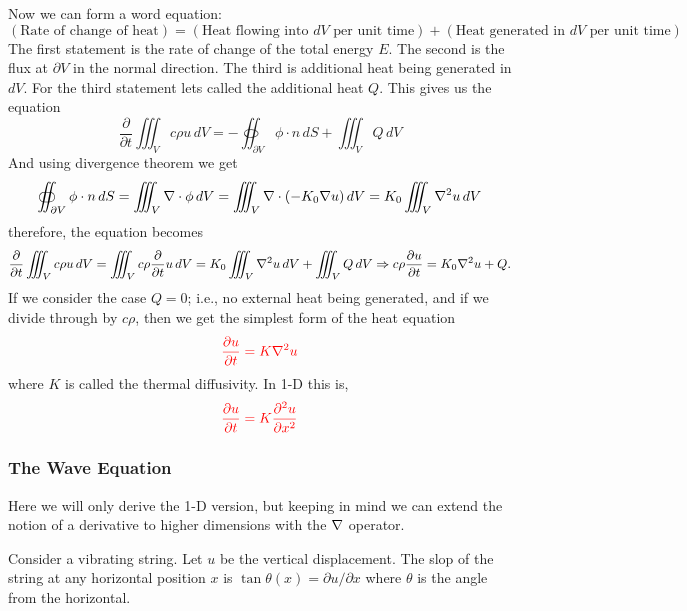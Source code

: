 \documentclass[reqno]{amsart}
\theoremstyle{definition}
\begin{document}
Now we can form a word equation:
%
\begin{equation}
\left(\text{Rate of change of heat}\right)
= \left(\text{Heat flowing into $dV$ per unit time}\right) +
\left(\text{Heat generated in $dV$ per unit time}\right)
\end{equation}
%
The first statement is the rate of change of the total energy $E$.
The second is the flux at $\partial V$ in the normal direction.  
The third is additional heat being generated in $dV$.  For the third
statement lets called the additional heat $Q$.
This gives us the equation
%
\begin{equation}
\frac{\partial}{\partial t} \iiint_V c\rho u\, dV
= - \oiint_{\partial V} \phi\cdot n\, dS
+\iiint_V Q\, dV
\end{equation}
%
And using divergence theorem we get
%
\begin{equation*}
\oiint_{\partial V} \phi\cdot n\, dS = \iiint_V \nabla\cdot\phi\, dV
= \iiint_V \nabla\cdot (-K_0\nabla u)\, dV = K_0\iiint_V \nabla^2u\, dV
\end{equation*}
%
therefore, the equation becomes
%
\begin{equation}
\frac{\partial}{\partial t} \iiint_V c\rho u\, dV
= \iiint_V c\rho \frac{\partial}{\partial t}u\, dV
= K_0\iiint_V \nabla^2u\, dV +\iiint_V Q\, dV
\Rightarrow c\rho \frac{\partial u}{\partial t} = K_0\nabla^2u + Q.
\end{equation}
%
If we consider the case $Q = 0$; i.e., no external heat being generated,
and if we divide through by $c\rho$, then we get the simplest form of the
heat equation
%
\begin{equation}
\color{red}\frac{\partial u}{\partial t} = K\nabla^2u
\end{equation}
%
where $K$ is called the thermal diffusivity.
%
In 1-D this is,
%
\begin{equation}
\color{red}\frac{\partial u}{\partial t} = K\frac{\partial^2 u}{\partial x^2}
\end{equation}


\subsubsection*{The Wave Equation}

Here we will only derive the 1-D version, but keeping in mind we can extend the notion
of a derivative to higher dimensions with the $\nabla$ operator.

Consider a vibrating string.  Let $u$ be the vertical displacement.
The slop of the string at any horizontal position $x$ is
$\tan\theta(x) = \partial u/\partial x$
where $\theta$ is the angle from the horizontal.
\end{document}
